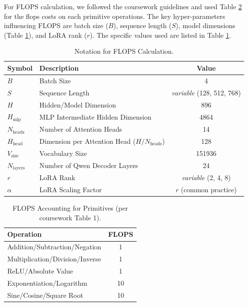 \documentclass{article}
\begin{document}
For FLOPS calculation, we followed the coursework guidelines and used Table \ref{tab:primitive_flops} for the flops costs on each primitive operations. The key hyper-parameters influencing FLOPS are batch size ($B$), sequence length ($S$), model dimensions (Table \ref{tab:notation}), and LoRA rank ($r$). The specific values used are listed in Table \ref{tab:notation}.

\begin{table}[!ht]
\renewcommand{\arraystretch}{1.3} \centering \setlength{\tabcolsep}{8pt}
\begin{tabular}{@{}llc@{}} %
    \toprule
    \textbf{Symbol} & \textbf{Description} & \textbf{Value} \\ \midrule
    $B$           & Batch Size & 4 \\
    $S$           & Sequence Length & \textit{variable} (128, 512, 768) \\
    $H$           & Hidden/Model Dimension & 896 \\
    $H_{\text{mlp}}$ & MLP Intermediate Hidden Dimension & 4864 \\
    $N_{\text{heads}}$ & Number of Attention Heads & 14 \\
    $H_{\text{head}}$ & Dimension per Attention Head ($H / N_{\text{heads}}$) & 128 \\
    $V_{\text{size}}$ & Vocabulary Size & 151936 \\
    $N_{\text{layers}}$ & Number of Qwen Decoder Layers & 24 \\
    $r$           & LoRA Rank & \textit{variable} (2, 4, 8) \\
    $\alpha$      & LoRA Scaling Factor & $r$ (common practice) \\ %
    \bottomrule
\end{tabular}
\caption{Notation for FLOPS Calculation.}
\label{tab:notation}
\end{table}

\begin{table}[!ht]
\renewcommand{\arraystretch}{1.4} \centering \setlength{\tabcolsep}{8pt}
\begin{tabular}{@{}lc@{}} %
    \toprule
    \textbf{Operation} & \textbf{FLOPS} \\ \midrule
    Addition/Subtraction/Negation & 1 \\
    Multiplication/Division/Inverse & 1 \\
    ReLU/Absolute Value & 1 \\
    Exponentiation/Logarithm & 10 \\
    Sine/Cosine/Square Root & 10 \\
    \bottomrule
\end{tabular}
\caption{FLOPS Accounting for Primitives (per coursework Table 1).}
\label{tab:primitive_flops}
\end{table}
\end{document}
